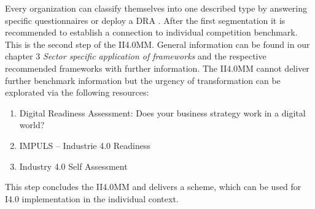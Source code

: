 Every organization can classify themselves into one described type by answering specific questionnaires or deploy a \ac{DRA} \cite{Schumacher2016161} \cite{ReadinessIndustrie40Impulse} \cite{i40-self-assessment-PwC:2016}. After the first segmentation it is recommended to establish a connection to individual competition benchmark. This is the second step of the \ac{II4.0MM}. General information can be found in our chapter 3 \emph{Sector specific application of frameworks} and the respective recommended frameworks with further information. The \ac{II4.0MM} cannot deliver further benchmark information but the urgency of transformation can be explorated via the following resources:
\begin{enumerate}
\item Digital Readiness Assessment: Does your business strategy work in a digital world? \cite{ey-dra}
\item IMPULS – Industrie 4.0 Readiness \cite{ReadinessIndustrie40Impulse}
\item Industry 4.0 Self Assessment \cite{i40-self-assessment-PwC:2016}
\end{enumerate}

This step concludes the \ac{II4.0MM} and delivers a scheme, which can be used for \ac{I4.0} implementation in the individual context.
